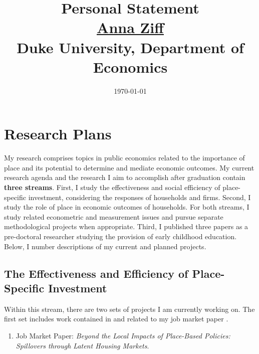 

\setlength{\parskip}{\baselineskip}%
\setlength{\parindent}{0pt}%
\setlength{\droptitle}{-5em}



\title{\normalsize \textbf{Personal Statement} \\ \href{https://aziff.github.io}{Anna Ziff} \\ Duke University, Department of Economics}
\date{\vspace{-2.25cm} \normalsize \today}
\maketitle

\section{Research Plans}

My research comprises topics in public economics related to the importance of place and its potential to determine and mediate economic outcomes. My current research agenda and the research I aim to accomplish after graduation contain \textbf{three streams}. First, I study the effectiveness and social efficiency of place-specific investment, considering the responses of households and firms. Second, I study the role of place in economic outcomes of households. For both streams, I study related econometric and measurement issues and pursue separate methodological projects when appropriate. Third, I published three papers as a pre-doctoral researcher studying the provision of early childhood education. Below, I number descriptions of my current and planned projects.

\subsection{The Effectiveness and Efficiency of Place-Specific Investment}

Within this stream, there are two sets of projects I am currently working on. The first set includes work contained in and related to my job market paper \citep{ziff_local_2023}. 


\begin{enumerate}
\item Job Market Paper: \textit{Beyond the Local Impacts of Place-Based Policies: Spillovers through Latent Housing Markets}.
\end{enumerate}


